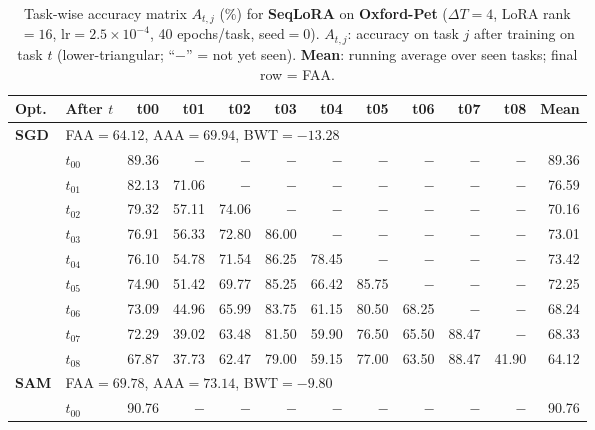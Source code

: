 
\begin{table}[ht]
\centering
\caption{%
  Task-wise accuracy matrix $A_{t,j}$ (\%) for \textbf{SeqLoRA} on \textbf{Oxford-Pet} ($\Delta T=4$, LoRA rank$=16$, lr$=2.5\times10^{-4}$, 40 epochs/task, seed$=0$).
  $A_{t,j}$: accuracy on task $j$ after training on task $t$  (lower-triangular; ``$-$'' = not yet seen).
  \textbf{Mean}: running average over seen tasks; final row = FAA.
}
\label{tab:raw_seqlora_pets}
\setlength{\tabcolsep}{2.8pt}
\renewcommand{\arraystretch}{0.88}
\scriptsize
\begin{tabular}{@{}l l r r r r r r r r r r@{}}
\toprule
\textbf{Opt.} & \textbf{After $t$} & \textbf{t00} & \textbf{t01} & \textbf{t02} & \textbf{t03} & \textbf{t04} & \textbf{t05} & \textbf{t06} & \textbf{t07} & \textbf{t08} & \textbf{Mean} \\
\midrule
\multirow{10}{*}{\textbf{SGD}} & \multicolumn{11}{l}{\quad\small FAA$=64.12$,\; AAA$=69.94$,\; BWT$=-13.28$} \\
 & $t_{00}$ & 89.36 & $-$ & $-$ & $-$ & $-$ & $-$ & $-$ & $-$ & $-$ & 89.36 \\
 & $t_{01}$ & 82.13 & 71.06 & $-$ & $-$ & $-$ & $-$ & $-$ & $-$ & $-$ & 76.59 \\
 & $t_{02}$ & 79.32 & 57.11 & 74.06 & $-$ & $-$ & $-$ & $-$ & $-$ & $-$ & 70.16 \\
 & $t_{03}$ & 76.91 & 56.33 & 72.80 & 86.00 & $-$ & $-$ & $-$ & $-$ & $-$ & 73.01 \\
 & $t_{04}$ & 76.10 & 54.78 & 71.54 & 86.25 & 78.45 & $-$ & $-$ & $-$ & $-$ & 73.42 \\
 & $t_{05}$ & 74.90 & 51.42 & 69.77 & 85.25 & 66.42 & 85.75 & $-$ & $-$ & $-$ & 72.25 \\
 & $t_{06}$ & 73.09 & 44.96 & 65.99 & 83.75 & 61.15 & 80.50 & 68.25 & $-$ & $-$ & 68.24 \\
 & $t_{07}$ & 72.29 & 39.02 & 63.48 & 81.50 & 59.90 & 76.50 & 65.50 & 88.47 & $-$ & 68.33 \\
 & $t_{08}$ & 67.87 & 37.73 & 62.47 & 79.00 & 59.15 & 77.00 & 63.50 & 88.47 & 41.90 & 64.12 \\
\midrule
\multirow{10}{*}{\textbf{SAM}} & \multicolumn{11}{l}{\quad\small FAA$=69.78$,\; AAA$=73.14$,\; BWT$=-9.80$} \\
 & $t_{00}$ & 90.76 & $-$ & $-$ & $-$ & $-$ & $-$ & $-$ & $-$ & $-$ & 90.76 \\

\end{tabular}
\end{table}
